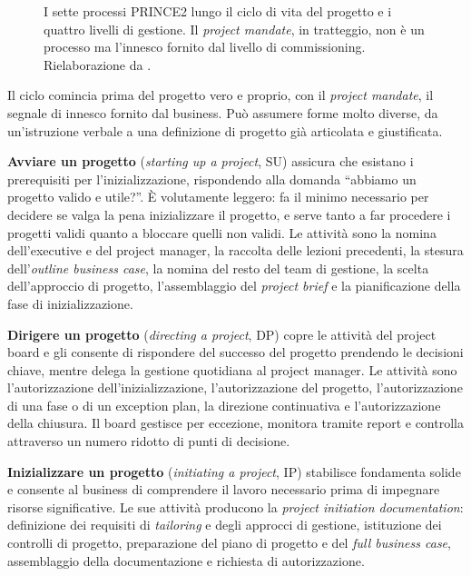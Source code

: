 \begin{figure}[htbp]
{}
\caption{I sette processi PRINCE2 lungo il ciclo di vita del progetto e i quattro livelli di gestione. Il \emph{project mandate}, in tratteggio, non \`e un processo ma l'innesco fornito dal livello di commissioning. Rielaborazione da \cite{prince27}.}
\label{fig:p2-processi}
\end{figure}

Il ciclo comincia prima del progetto vero e proprio, con il \emph{project
mandate}, il segnale di innesco fornito dal business. Pu\`o assumere forme molto
diverse, da un'istruzione verbale a una definizione di progetto gi\`a articolata
e giustificata.

\textbf{Avviare un progetto} (\emph{starting up a project}, SU) assicura che
esistano i prerequisiti per l'inizializzazione, rispondendo alla domanda
``abbiamo un progetto valido e utile?''. \`E volutamente leggero: fa il minimo
necessario per decidere se valga la pena inizializzare il progetto, e serve
tanto a far procedere i progetti validi quanto a bloccare quelli non validi.
Le attivit\`a sono la nomina dell'executive e del project
manager, la raccolta delle lezioni precedenti, la stesura dell'\emph{outline
business case}, la nomina del resto del team di gestione, la scelta
dell'approccio di progetto, l'assemblaggio del \emph{project brief} e la
pianificazione della fase di inizializzazione.

\textbf{Dirigere un progetto} (\emph{directing a project}, DP) copre le
attivit\`a del project board e gli consente di rispondere del successo del
progetto prendendo le decisioni chiave, mentre delega la gestione quotidiana al
project manager. Le attivit\`a sono l'autorizzazione dell'inizializzazione,
l'autorizzazione del progetto, l'autorizzazione di una fase o di un exception
plan, la direzione continuativa e l'autorizzazione della chiusura. Il board
gestisce per eccezione, monitora tramite report e controlla attraverso un numero
ridotto di punti di decisione.

\textbf{Inizializzare un progetto} (\emph{initiating a project}, IP) stabilisce
fondamenta solide e consente al business di comprendere il lavoro necessario
prima di impegnare risorse significative. Le sue attivit\`a producono la
\emph{project initiation documentation}: definizione dei requisiti di
\emph{tailoring} e degli approcci di gestione, istituzione dei controlli di
progetto, preparazione del piano di progetto e del \emph{full business case},
assemblaggio della documentazione e richiesta di autorizzazione.

